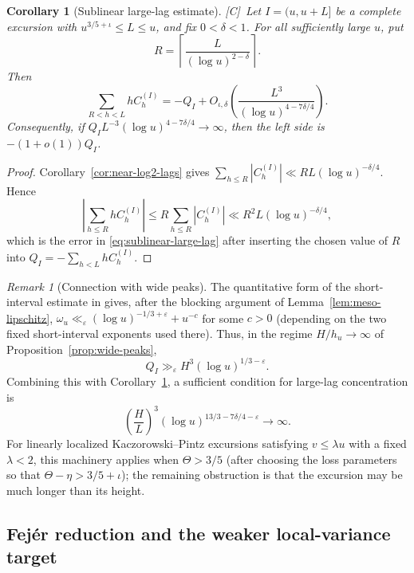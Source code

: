 \documentclass[11pt]{amsart}
\numberwithin{equation}{section}
\theoremstyle{plain}
\newtheorem{corollary}[theorem]{Corollary}
\theoremstyle{definition}
\theoremstyle{remark}
\newtheorem{remark}[theorem]{Remark}
\newcommand{\tagC}{\textup{[C]}}
\begin{document}
\begin{corollary}[Sublinear large-lag estimate]
\label{cor:sublinear-large-lag}
\tagC\ Let $I=(u,u+L]$ be a complete excursion with
$u^{3/5+\iota}\le L\le u$, and fix $0<\delta<1$.  For all sufficiently
large $u$, put
\[
R=\left\lceil\frac{L}{(\log u)^{2-\delta}}\right\rceil.
\]
Then
\begin{equation}
\label{eq:sublinear-large-lag}
\sum_{R<h<L}hC_h^{(I)}
=-Q_I+O_{\iota,\delta}\!\left(
\frac{L^3}{(\log u)^{4-7\delta/4}}
\right).
\end{equation}
Consequently, if
$Q_I L^{-3}(\log u)^{4-7\delta/4}\to\infty$, then the left side is
$-(1+o(1))Q_I$.
\end{corollary}

\begin{proof}
Corollary~\ref{cor:near-log2-lags} gives
$\sum_{h\le R}|C_h^{(I)}|\ll RL(\log u)^{-\delta/4}$. Hence
\[
\left|\sum_{h\le R}hC_h^{(I)}\right|
\le R\sum_{h\le R}|C_h^{(I)}|
\ll R^2L(\log u)^{-\delta/4},
\]
which is the error in \eqref{eq:sublinear-large-lag} after inserting the
chosen value of $R$ into $Q_I=-\sum_{h<L}hC_h^{(I)}$.
\end{proof}

\begin{remark}[Connection with wide peaks]
\label{rem:sublinear-wide-peaks}
The quantitative form of the short-interval estimate in
\cite[Theorem~1.1]{MatomakiTeravainen2023} gives, after the blocking argument
of Lemma~\ref{lem:meso-lipschitz},
$\omega_u\ll_\varepsilon(\log u)^{-1/3+\varepsilon}+u^{-c}$ for some $c>0$
(depending on the two fixed short-interval exponents used there). Thus, in
the regime $H/h_u\to\infty$ of Proposition~\ref{prop:wide-peaks},
\[
Q_I\gg_\varepsilon H^3(\log u)^{1/3-\varepsilon}.
\]
Combining this with Corollary~\ref{cor:sublinear-large-lag}, a sufficient
condition for large-lag concentration is
\[
\left(\frac HL\right)^3
(\log u)^{13/3-7\delta/4-\varepsilon}\longrightarrow\infty.
\]
For linearly localized Kaczorowski--Pintz excursions satisfying
$v\le\lambda u$ with a fixed $\lambda<2$, this machinery applies when
$\Theta>3/5$ (after choosing the loss parameters so that
$\Theta-\eta>3/5+\iota$); the remaining obstruction is that the excursion
may be much longer than its height.
\end{remark}

\subsection{Fej\'er reduction and the weaker local-variance target}
\end{document}
